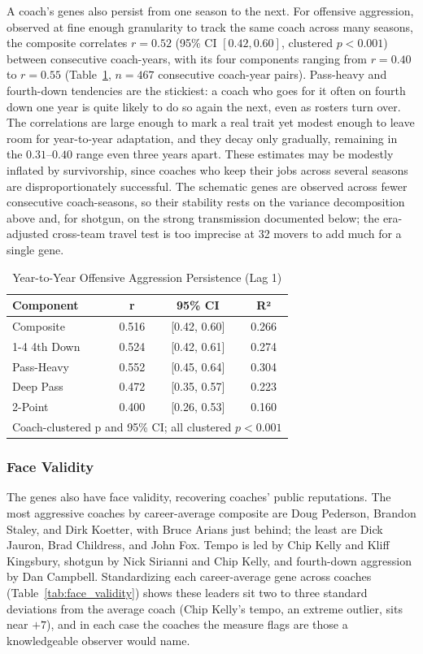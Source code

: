 \documentclass[USenglish]{article}
\theoremstyle{dgthm}
\theoremstyle{dgdef}
\begin{document}
A coach's genes also persist from one season to the next. For offensive aggression, observed at fine enough granularity to track the same coach across many seasons, the composite correlates $r=0.52$ (95\% CI $[0.42, 0.60]$, clustered $p<0.001$) between consecutive coach-years, with its four components ranging from $r=0.40$ to $r=0.55$ (Table~\ref{tab:persistence}, $n=467$ consecutive coach-year pairs). Pass-heavy and fourth-down tendencies are the stickiest: a coach who goes for it often on fourth down one year is quite likely to do so again the next, even as rosters turn over. The correlations are large enough to mark a real trait yet modest enough to leave room for year-to-year adaptation, and they decay only gradually, remaining in the $0.31$--$0.40$ range even three years apart. These estimates may be modestly inflated by survivorship, since coaches who keep their jobs across several seasons are disproportionately successful. The schematic genes are observed across fewer consecutive coach-seasons, so their stability rests on the variance decomposition above and, for shotgun, on the strong transmission documented below; the era-adjusted cross-team travel test is too imprecise at 32 movers to add much for a single gene.

\begin{table}[H]
\caption{Year-to-Year Offensive Aggression Persistence (Lag 1)}
\label{tab:persistence}
\begin{tabular}{lccc}
\toprule
\textbf{Component} & \textbf{r} & \textbf{95\% CI} & \textbf{R²} \\
\midrule
Composite & 0.516 & [0.42, 0.60] & 0.266 \\
\cmidrule{1-4}
4th Down & 0.524 & [0.42, 0.61] & 0.274 \\
Pass-Heavy & 0.552 & [0.45, 0.64] & 0.304 \\
Deep Pass & 0.472 & [0.35, 0.57] & 0.223 \\
2-Point & 0.400 & [0.26, 0.53] & 0.160 \\
\midrule
\multicolumn{4}{l}{\small Coach-clustered p and 95\% CI; all clustered $p<0.001$}\\
\bottomrule
\end{tabular}
\end{table}

\subsubsection{Face Validity}

The genes also have face validity, recovering coaches' public reputations. The most aggressive coaches by career-average composite are Doug Pederson, Brandon Staley, and Dirk Koetter, with Bruce Arians just behind; the least are Dick Jauron, Brad Childress, and John Fox. Tempo is led by Chip Kelly and Kliff Kingsbury, shotgun by Nick Sirianni and Chip Kelly, and fourth-down aggression by Dan Campbell. Standardizing each career-average gene across coaches (Table~\ref{tab:face_validity}) shows these leaders sit two to three standard deviations from the average coach (Chip Kelly's tempo, an extreme outlier, sits near $+7$), and in each case the coaches the measure flags are those a knowledgeable observer would name.
\end{document}
